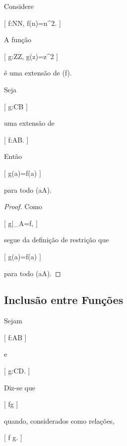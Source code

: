 \begin{ex}

	Considere

	[
	f:\mathbb N\to\mathbb N,
	\qquad
	f(n)=n^2.
	]

	A função

	[
	g:\mathbb Z\to\mathbb Z,
	\qquad
	g(z)=z^2
	]

	é uma extensão de (f).

\end{ex}

\begin{prop}
	\label{prop:matematica:funcoes:restricoes-e-extensoes:extensao-determina}

	Seja

		[
			g:C\to B
		]

	uma extensão de

		[
			f:A\to B.
		]

	Então

	[
	g(a)=f(a)
	]

	para todo (a\in A).

\end{prop}

\begin{proof}

	Como

	[
	g|_A=f,
	]

	segue da definição de restrição que

		[
			g(a)=f(a)
		]

	para todo (a\in A).

\end{proof}

\subsection{Inclusão entre Funções}

\begin{defn}
	\label{def:matematica:funcoes:restricoes-e-extensoes:inclusao}

	Sejam

		[
			f:A\to B
		]

	e

		[
			g:C\to D.
		]

	Diz-se que

		[
			f\subseteq g
		]

	quando, considerados como relações,

	[
			f
			\subseteq
			g.
		]

\end{defn}

